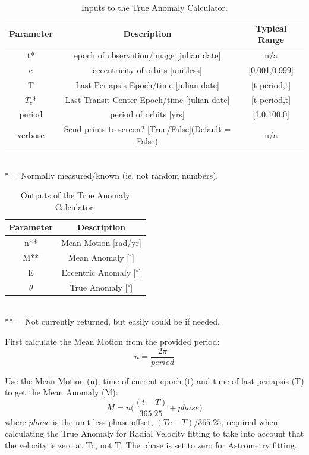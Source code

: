 \documentclass[12pt,preprint]{aastex}
\begin{document}
\begin{table}[h]
\centering
\caption{ Inputs to the True Anomaly Calculator.}
\begin{tabular}{c c c}
\hline\hline
Parameter & Description & Typical Range \\
\hline
t* & epoch of observation/image [julian date] & n/a\\
e & eccentricity of orbits [unitless] & [0.001,0.999]\\
T & Last Periapsis Epoch/time [julian date] & [t-period,t]\\
$T_c$* & Last Transit Center Epoch/time [julian date] & [t-period,t]\\
period & period of orbits [yrs] & [1.0,100.0]\\
verbose & Send prints to screen? [True/False](Default = False) & n/a\\
\hline
\end{tabular}
\\
 * = Normally measured/known (ie. not random numbers).
\end{table}


\begin{table}[h]
\centering
\caption{ Outputs of the True Anomaly Calculator.}
\begin{tabular}{c c}
\hline\hline
Parameter & Description \\
\hline
n** & Mean Motion [rad/yr] \\
M** & Mean Anomaly [$^{\circ}$]\\
E & Eccentric Anomaly [$^{\circ}$]\\
$\theta$ & True Anomaly [$^{\circ}$]\\
\hline
\end{tabular}
\\
 ** = Not currently returned, but easily could be if needed.
\end{table}
\pagebreak

First calculate the Mean Motion from the provided period:
\begin{equation}\label{eq:4.1.1}
n = \frac{2\pi}{period} 
\end{equation}

Use the Mean Motion (n), time of current epoch (t) and time of last periapsis (T) to get the Mean Anomaly (M):
\begin{equation}\label{eq:4.1.2}
M = n \bigg( \frac{(t-T)}{365.25} + phase\bigg)
\end{equation}
where $phase$ is the unit less phase offset, $(Tc-T)/365.25$, required when calculating the True Anomaly for Radial Velocity fitting to take into account that the velocity is zero at Tc, not T.  The phase is set to zero for Astrometry fitting.
\end{document}
